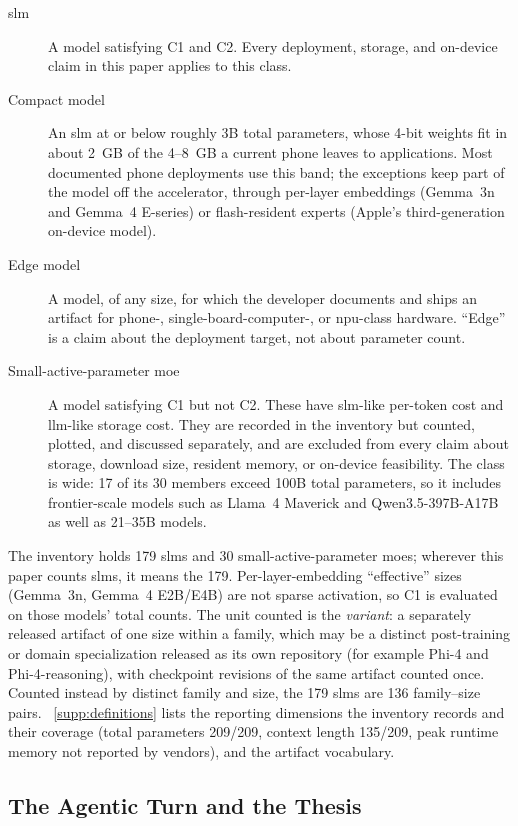 \begin{description}
  \item[\gls{slm}] A model satisfying C1 and C2. Every deployment, storage, and on-device claim in this paper applies to this class.
  \item[Compact model] An \gls{slm} at or below roughly 3B total parameters, whose 4-bit weights fit in about 2~GB of the 4--8~GB a current phone leaves to applications. Most documented phone deployments use this band; the exceptions keep part of the model off the accelerator, through per-layer embeddings (Gemma~3n and Gemma~4 E-series) or flash-resident experts (Apple's third-generation on-device model).
  \item[Edge model] A model, of any size, for which the developer documents and ships an artifact for phone-, single-board-computer-, or \gls{npu}-class hardware. ``Edge'' is a claim about the deployment target, not about parameter count.
  \item[Small-active-parameter \gls{moe}] A model satisfying C1 but not C2. These have \gls{slm}-like per-token cost and \gls{llm}-like storage cost. They are recorded in the inventory but counted, plotted, and discussed separately, and are excluded from every claim about storage, download size, resident memory, or on-device feasibility. The class is wide: 17 of its 30 members exceed 100B total parameters, so it includes frontier-scale models such as Llama~4 Maverick and Qwen3.5-397B-A17B as well as 21--35B models.
\end{description}

The inventory holds 179 \glspl{slm} and 30 small-active-parameter \glspl{moe}; wherever this paper counts \glspl{slm}, it means the 179. Per-layer-embedding ``effective'' sizes (Gemma~3n, Gemma~4 E2B/E4B) are not sparse activation, so C1 is evaluated on those models' total counts. The unit counted is the \emph{variant}: a separately released artifact of one size within a family, which may be a distinct post-training or domain specialization released as its own repository (for example Phi-4 and Phi-4-reasoning), with checkpoint revisions of the same artifact counted once. Counted instead by distinct family and size, the 179 \glspl{slm} are 136 family--size pairs. \suppsec~\ref{supp:definitions} lists the reporting dimensions the inventory records and their coverage (total parameters 209/209, context length 135/209, peak runtime memory not reported by vendors), and the artifact vocabulary.

\subsection{The Agentic Turn and the Thesis}
\label{subsec:intro_agentic}
\label{subsec:intro_thesis}

